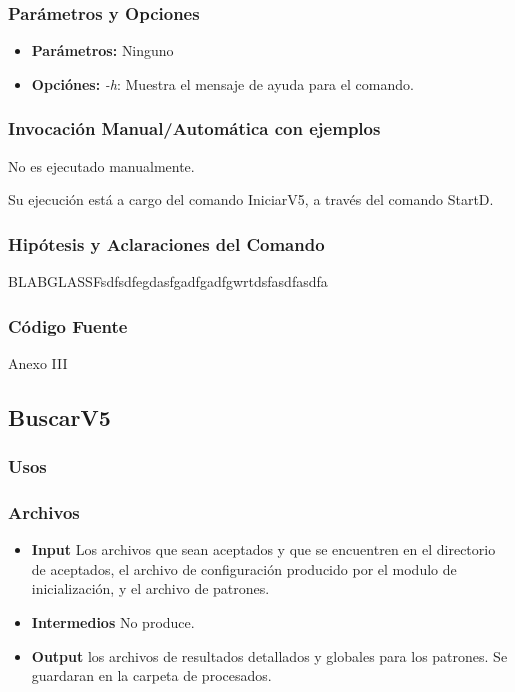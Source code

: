 \documentclass[a4paper,10pt,titlepage]{article}
\begin{document}
		\subsubsection{Par\'ametros y Opciones}
			\begin {itemize}
				\item \textbf{Par\'ametros: }{Ninguno}
				\item \textbf{Opci\'ones: } {\textit{-h}: Muestra el mensaje de ayuda para el comando.}
			\end{itemize}
	
		\subsubsection{Invocaci\'on Manual/Autom\'atica con ejemplos}
			No es ejecutado manualmente. 

			Su ejecuci\'on est\'a a cargo del comando IniciarV5, a trav\'es del comando StartD.

		\subsubsection{Hip\'otesis y Aclaraciones del Comando}

BLABGLASSFsdfsdfegdasfgadfgadfgwrtdsfasdfasdfa


		\subsubsection{C\'odigo Fuente}
			Anexo III

	\subsection{BuscarV5}
		\subsubsection{Usos}
			 

		\subsubsection{Archivos}
			\begin {itemize}
				\item \textbf{Input} {Los archivos que sean aceptados y que se encuentren en el directorio de aceptados, el archivo de configuración producido por el modulo de inicialización, y el archivo de patrones.}
				\item \textbf{Intermedios} {No produce.}
				\item \textbf{Output} {los archivos de resultados detallados y globales para los patrones. Se guardaran en la carpeta de procesados.}
			\end{itemize}
\end{document}
